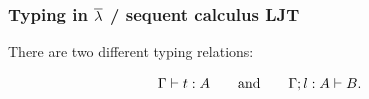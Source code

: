 \begin{frame}
  \frametitle{Typing in $\olb$ / sequent calculus LJT}
  
  There are two different typing relations:
  
  \[ \Seqt{\Gamma}{t}{A} \qquad \text{and} \qquad \Seql{\Gamma}{A}{l}{B}. \]
  
  
\end{frame}

